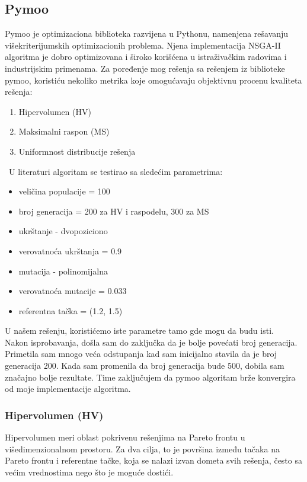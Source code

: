 \documentclass[12pt]{article}
\begin{document}
\subsection{Pymoo}
Pymoo je optimizaciona biblioteka razvijena u Pythonu, namenjena rešavanju višekriterijumskih optimizacionih problema. Njena implementacija NSGA-II algoritma je dobro optimizovana i široko korišćena u istraživačkim radovima i industrijskim primenama.
Za poređenje mog rešenja sa rešenjem iz biblioteke pymoo, koristiću nekoliko metrika koje omogućavaju objektivnu procenu kvaliteta rešenja:
\begin{enumerate} 
	\item {Hipervolumen (HV)} 
	\item {Maksimalni raspon (MS)}  
	\item {Uniformnost distribucije rešenja} 
\end{enumerate}
\
U literaturi \cite{gete-plots} algoritam se testirao sa sledećim parametrima:
\begin{itemize}
\item veličina populacije = 100
\item broj generacija = 200 za HV i raspodelu, 300 za MS
\item ukrštanje - dvopoziciono
\item verovatnoća ukrštanja = 0.9
\item mutacija - polinomijalna
\item verovatnoća mutacije = 0.033
\item referentna tačka = (1.2, 1.5)
\end{itemize}
U našem rešenju, koristićemo iste parametre tamo gde mogu da budu isti.
\\
Nakon isprobavanja, došla sam do zaključka da je bolje povećati broj generacija. Primetila sam mnogo veća odstupanja kad sam inicijalno stavila da je broj generacija 200. Kada sam promenila da broj generacija bude 500, dobila sam značajno bolje rezultate. Time zaključujem da pymoo algoritam brže konvergira od moje implementacije algoritma.

\subsubsection{Hipervolumen (HV)}
Hipervolumen meri oblast pokrivenu rešenjima na Pareto frontu u višedimenzionalnom prostoru. Za dva cilja, to je površina između tačaka na Pareto frontu i referentne tačke, koja se nalazi izvan dometa svih rešenja, često sa većim vrednostima nego što je moguće dostići.
   
\end{document}

